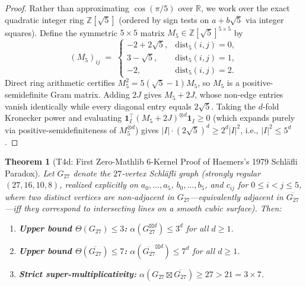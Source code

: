 \documentclass[11pt,reqno]{amsart}
\newtheorem{theorem}{Theorem}[section]
\theoremstyle{definition}
\newcommand{\Z}{\mathbb{Z}}
\newcommand{\R}{\mathbb{R}}
\newcommand{\sprod}{\boxtimes}
\begin{document}
\begin{proof}
Rather than approximating $\cos(\pi/5)$ over $\R$, we work over the exact quadratic integer ring $\Z[\sqrt{5}]$ (ordered by sign tests on $a + b\sqrt{5}$ via integer squares). Define the symmetric $5\times 5$ matrix $M_5 \in \Z[\sqrt{5}]^{5\times 5}$ by
\[
  (M_5)_{ij} \;=\; \begin{cases}
    -2 + 2\sqrt{5}, & \mathrm{dist}_5(i,j)=0,\\
     3 - \sqrt{5},  & \mathrm{dist}_5(i,j)=1,\\
    -2,             & \mathrm{dist}_5(i,j)=2.
  \end{cases}
\]
Direct ring arithmetic certifies $M_5^2 = 5(\sqrt{5}-1) M_5$, so $M_5$ is a positive-semidefinite Gram matrix. Adding $2J$ gives $M_5 + 2J$, whose non-edge entries vanish identically while every diagonal entry equals $2\sqrt{5}$. Taking the $d$-fold Kronecker power and evaluating $\mathbf{1}_I^\top (M_5 + 2J)^{\otimes d} \mathbf{1}_I \ge 0$ (which expands purely via positive-semidefiniteness of $M_5^{\otimes d}$) gives $|I|\cdot (2\sqrt{5})^d \ge 2^d |I|^2$, i.e., $|I|^2 \le 5^d$.
\end{proof}

\begin{theorem}[T4d: First Zero-Mathlib 6-Kernel Proof of Haemers's 1979 Schläfli Paradox]\label{thm:t4d}
Let $G_{27}$ denote the $27$-vertex Schläfli graph (strongly regular $(27,16,10,8)$, realized explicitly on $a_0,\dots,a_5$, $b_0,\dots,b_5$, and $c_{ij}$ for $0\le i < j \le 5$, where two distinct vertices are non-adjacent in $G_{27}$---equivalently adjacent in $\overline{G_{27}}$---iff they correspond to intersecting lines on a smooth cubic surface). Then:
\begin{enumerate}[label=(\roman*),leftmargin=2.2em]
  \item \textbf{Upper bound $\Theta(G_{27}) \le 3$:} $\alpha(G_{27}^{\sprod d}) \le 3^d$ for all $d \ge 1$.
  \item \textbf{Upper bound $\Theta(\overline{G_{27}}) \le 7$:} $\alpha(\overline{G_{27}}^{\sprod d}) \le 7^d$ for all $d \ge 1$.
  \item \textbf{Strict super-multiplicativity:} $\alpha(G_{27} \sprod \overline{G_{27}}) \ge 27 > 21 = 3 \times 7$.
\end{enumerate}
\end{theorem}
\end{document}
